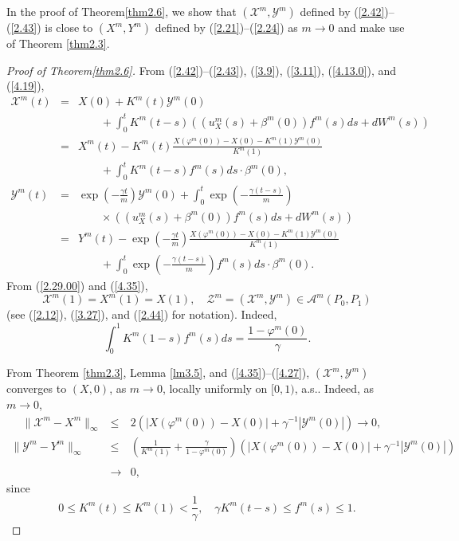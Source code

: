 \documentclass[12pt]{article}
\begin{document}
In the proof of Theorem\ref{thm2.6},
we show that  $(\mathcal{X}^m,\mathcal{Y}^m)$ defined by (\ref{2.42})--(\ref{2.43})
is close to $(X^m, Y^m )$ defined by (\ref{2.21})--(\ref{2.24}) as $m\to 0$ and make use of 
Theorem \ref{thm2.3}.

\begin{proof}[Proof of Theorem\ref{thm2.6}]
From  (\ref{2.42})--(\ref{2.43}), (\ref{3.9}), (\ref{3.11}), (\ref{4.13.0}), and (\ref{4.19}), 
\begin{eqnarray}
\mathcal{X}^m(t)
 &=&X(0)+K^m(t)\mathcal{Y}^m(0)\label{4.35}\\
 &&\qquad +\int_0^tK^m(t-s)
\left(\left(u_{X}^m(s)
+\beta^m(0)\right)f^m(s)ds+dW^m(s)\right)\nonumber\\
&=&X^m(t)-K^m(t)\frac{X(\varphi^m(0))-X(0)-K^m(1)\mathcal{Y}^m(0)}{K^m(1)}\nonumber\\
&&\qquad +\int_0^tK^m(t-s)f^m(s)ds\cdot \beta^m(0),\nonumber\\
\mathcal{Y}^m(t)
&=&\exp\left(-\frac{\gamma t}{m}\right)\mathcal{Y}^m(0)+
\int_{0}^{t}\exp\left(-\frac{\gamma (t-s)}{m}\right)\label{4.27}\\
&&\qquad\times \left(\left(u_{X}^m(s)+\beta^m(0)\right)f^m(s)ds +dW^m(s)\right)\nonumber\\
&=&Y^m(t)-\exp\left(-\frac{\gamma t}{m}\right)\frac{X(\varphi^m(0))-X(0)-K^m(1)\mathcal{Y}^m(0)}{K^m(1)}\nonumber\\
&&\qquad +\int_{0}^{t}\exp\left(-\frac{\gamma (t-s)}{m}\right)f^m(s)ds\cdot \beta^m(0).\nonumber
\end{eqnarray}
From (\ref{2.29.00}) and (\ref{4.35}), 
\begin{equation}
\mathcal{X}^m(1)=X^m(1)=X(1),\quad \mathcal{Z}^m=(\mathcal{X}^m, \mathcal{Y}^m)\in \mathcal{A}^m(P_0,P_1)
\end{equation}
(see (\ref{2.12}), (\ref{3.27}), and (\ref{2.44}) for notation).
Indeed,
$$\int_0^1K^m(1-s)f^m(s)ds=\frac{1-\varphi^m(0)}{\gamma}.$$

From Theorem \ref{thm2.3}, Lemma \ref{lm3.5}, and (\ref{4.35})--(\ref{4.27}),
$(\mathcal{X}^m,\mathcal{Y}^m)$ converges  to $(X,0)$, as $m\to 0$, locally uniformly on $[0,1)$, a.s..
Indeed,  as $m\to0$,
\begin{eqnarray}
\quad \|\mathcal{X}^m-X^m\|_\infty&\le& 2(|X(\varphi^m(0))-X(0)|+
\gamma^{-1}|\mathcal{Y}^m(0)|)\to 0, \\
\|\mathcal{Y}^m-Y^m\|_\infty&\le& \left(\frac{1}{K^m(1)}+\frac{\gamma}{1-\varphi ^m(0)}\right)
 (|X(\varphi^m(0))-X(0)|+\gamma^{-1}|\mathcal{Y}^m(0)|)\nonumber\\
 \\
 &\to& 0, \nonumber
 \end{eqnarray}
since 
$$0\le K^m(t)\le K^m(1)<\frac{1}{\gamma}, \quad \gamma K^m(t-s)\le f^m(s)\le 1.$$


\end{proof}
\end{document}

